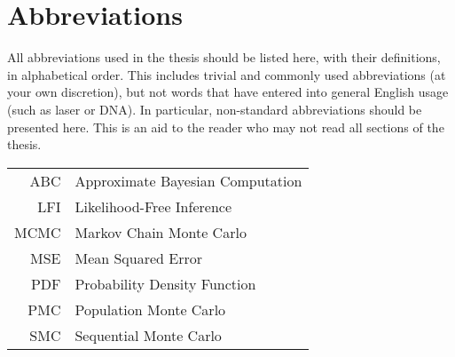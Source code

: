 \chapter*{Abbreviations}
\thispagestyle{plain}

All abbreviations used in the thesis should be listed here, with their definitions, in alphabetical order.  This includes trivial and commonly used abbreviations (at your own discretion), but not words that have entered into general English usage (such as laser or DNA).  In particular, non-standard abbreviations should be presented here.  This is an aid to the reader who may not read all sections of the thesis. %


\begin{longtable}{rl}
    ABC & Approximate Bayesian Computation \\
    LFI & Likelihood-Free Inference \\
    MCMC & Markov Chain Monte Carlo \\
    MSE & Mean Squared Error \\
    PDF & Probability Density Function \\
    PMC & Population Monte Carlo \\
    SMC & Sequential Monte Carlo
\end{longtable}

